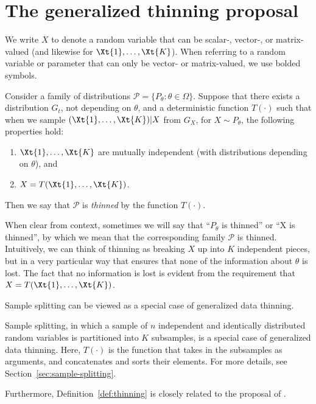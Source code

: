\documentclass[12pt]{article}
\begin{document}
\section{The generalized thinning proposal}
\label{sec:method}
We write $X$ to denote a random variable that can be scalar-, vector-, or matrix-valued (and likewise for $\Xt{1},\ldots,\Xt{K}$). When referring to a random variable or parameter that can only be vector- or matrix-valued, we use bolded symbols.
\begin{definition} 
\label{def:thinning}
Consider a family of distributions $\mathcal P=\{P_\theta:\theta\in\Omega\}$. Suppose that there exists a distribution $G_t$, not depending on $\theta$, and a deterministic function $T(\cdot)$ such that when we sample $(\Xt{1},\ldots,\Xt{K})|X$ from $G_X$, for  $X \sim P_\theta$, the following properties hold: 
\begin{enumerate}
  \item $\Xt{1},\ldots,\Xt{K}$ are mutually independent (with distributions depending on $\theta$),  and
    \item $X=T(\Xt{1},\ldots,\Xt{K})$. 
\end{enumerate}
Then we say that $\mathcal{P}$ is \emph{thinned} by the function $T(\cdot)$.
\end{definition}
When clear from context, sometimes we will say that ``$P_\theta$ is thinned'' or ``X is thinned'', by which we mean that the corresponding family $\mathcal P$ is thinned. 
Intuitively, we can think of thinning as breaking $X$ up into $K$ independent pieces, but in a very particular way that ensures that none of the information about $\theta$ is lost. The fact that no information is lost is evident from the requirement that $X=T(\Xt{1},\ldots,\Xt{K})$. 

Sample splitting \citep{cox1975note} can be viewed as a special case of generalized data thinning. 
\begin{remark} \label{remark:samplesplit}
Sample splitting, in which a sample of $n$ independent and identically distributed random variables is partitioned into $K$ subsamples, is a special case of generalized data thinning.  Here, $T(\cdot)$ is the function that takes in the subsamples as arguments, and concatenates and sorts their elements. For more details, see Section~\ref{sec:sample-splitting}.
\end{remark}

Furthermore, Definition~\ref{def:thinning} is closely related to the proposal of \cite{neufeld2023data}.   
\end{document}
